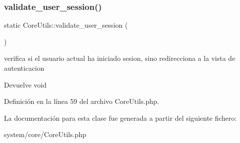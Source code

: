 \subsubsection{\texorpdfstring{validate\_user\_session()}{validate\_user\_session()}}
{\footnotesize\ttfamily static Core\+Utils\+::validate\+\_\+user\+\_\+session (\begin{DoxyParamCaption}{ }\end{DoxyParamCaption})\hspace{0.3cm}{\ttfamily [static]}}

verifica si el usuario actual ha iniciado sesion, sino redirecciona a la vista de autenticacion

\begin{DoxyReturn}{Devuelve}
void 
\end{DoxyReturn}


Definición en la línea 59 del archivo Core\+Utils.\+php.



La documentación para esta clase fue generada a partir del siguiente fichero\+:\begin{DoxyCompactItemize}
\item 
system/core/Core\+Utils.\+php\end{DoxyCompactItemize}
